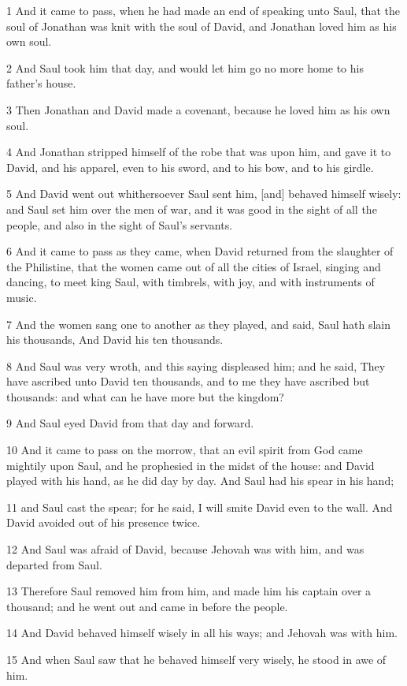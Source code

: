 \par 1 And it came to pass, when he had made an end of speaking unto Saul, that the soul of Jonathan was knit with the soul of David, and Jonathan loved him as his own soul.
\par 2 And Saul took him that day, and would let him go no more home to his father's house.
\par 3 Then Jonathan and David made a covenant, because he loved him as his own soul.
\par 4 And Jonathan stripped himself of the robe that was upon him, and gave it to David, and his apparel, even to his sword, and to his bow, and to his girdle.
\par 5 And David went out whithersoever Saul sent him, [and] behaved himself wisely: and Saul set him over the men of war, and it was good in the sight of all the people, and also in the sight of Saul's servants.
\par 6 And it came to pass as they came, when David returned from the slaughter of the Philistine, that the women came out of all the cities of Israel, singing and dancing, to meet king Saul, with timbrels, with joy, and with instruments of music.
\par 7 And the women sang one to another as they played, and said, Saul hath slain his thousands, And David his ten thousands.
\par 8 And Saul was very wroth, and this saying displeased him; and he said, They have ascribed unto David ten thousands, and to me they have ascribed but thousands: and what can he have more but the kingdom?
\par 9 And Saul eyed David from that day and forward.
\par 10 And it came to pass on the morrow, that an evil spirit from God came mightily upon Saul, and he prophesied in the midst of the house: and David played with his hand, as he did day by day. And Saul had his spear in his hand;
\par 11 and Saul cast the spear; for he said, I will smite David even to the wall. And David avoided out of his presence twice.
\par 12 And Saul was afraid of David, because Jehovah was with him, and was departed from Saul.
\par 13 Therefore Saul removed him from him, and made him his captain over a thousand; and he went out and came in before the people.
\par 14 And David behaved himself wisely in all his ways; and Jehovah was with him.
\par 15 And when Saul saw that he behaved himself very wisely, he stood in awe of him.
